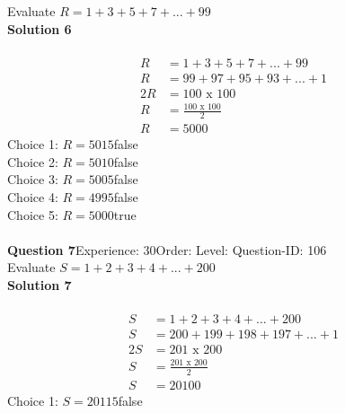 \documentclass{article}
\begin{document}
Evaluate $R=1+3+5+7+...+99$\\[4pt]
\noindent\textbf{Solution 6}\\[2pt]
\\[-35pt]\begin{align*}
R&=1+3+5+7+...+99\\[2pt]
R&=99+97+95+93+...+1\\[2pt]
2R&=100\,\,\text{x}\,\,100\\[2pt]
R&=\displaystyle\frac{100\,\,\text{x}\,\,100}{2}\\[2pt]
R&=5000
\end{align*}
Choice 1: \hspace{20pt}$R=5015$\hspace{20pt}false\\
Choice 2: \hspace{20pt}$R=5010$\hspace{20pt}false\\
Choice 3: \hspace{20pt}$R=5005$\hspace{20pt}false\\
Choice 4: \hspace{20pt}$R=4995$\hspace{20pt}false\\
Choice 5: \hspace{20pt}$R=5000$\hspace{20pt}true\\
\\[4pt]
\noindent\textbf{Question 7}\hspace{20pt}Experience: 30\hspace{20pt}Order: \hspace{20pt}Level: \hspace{20pt}Question-ID: 106\\[2pt]
Evaluate $S=1+2+3+4+...+200$\\[4pt]
\noindent\textbf{Solution 7}\\[2pt]
\\[-35pt]\begin{align*}
S&=1+2+3+4+...+200\\[2pt]
S&=200+199+198+197+...+1\\[2pt]
2S&=201\,\,\text{x}\,\,200\\[2pt]
S&=\displaystyle\frac{201\,\,\text{x}\,\,200}{2}\\[2pt]
S&=20100
\end{align*}
Choice 1: \hspace{20pt}$S=20115$\hspace{20pt}false\\
\end{document}
